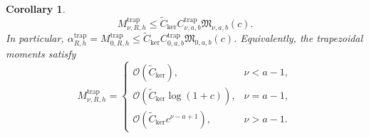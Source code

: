 \documentclass[10pt,a4paper]{amsart}
\newtheorem{cor}{Corollary}
\begin{document}
\begin{cor}
\begin{equation}\label{eq:trap-sharp-moment-bound}
M_{\nu,R,h}^{\operatorname{trap}}\le \widetilde C_{\operatorname{ker}}C_{\nu,a,b}^{\operatorname{trap}}\mathfrak M_{\nu,a,b}(c).
\end{equation}
In particular, \(\alpha_{R,h}^{\operatorname{trap}}=M_{0,R,h}^{\operatorname{trap}}\le \widetilde C_{\operatorname{ker}}C_{0,a,b}^{\operatorname{trap}}\mathfrak M_{0,a,b}(c)\). Equivalently, the trapezoidal moments satisfy
\begin{equation}\label{eq:trap-sharp-moment-asymptotic}
M_{\nu,R,h}^{\operatorname{trap}} = \begin{cases} \mathcal O(\widetilde C_{\operatorname{ker}}), & \nu<a-1,\\ \mathcal O(\widetilde C_{\operatorname{ker}}\log(1+c)), & \nu=a-1,\\ \mathcal O(\widetilde C_{\operatorname{ker}}c^{\nu-a+1}), & \nu>a-1. \end{cases}
\end{equation}
\end{cor}
\end{document}
